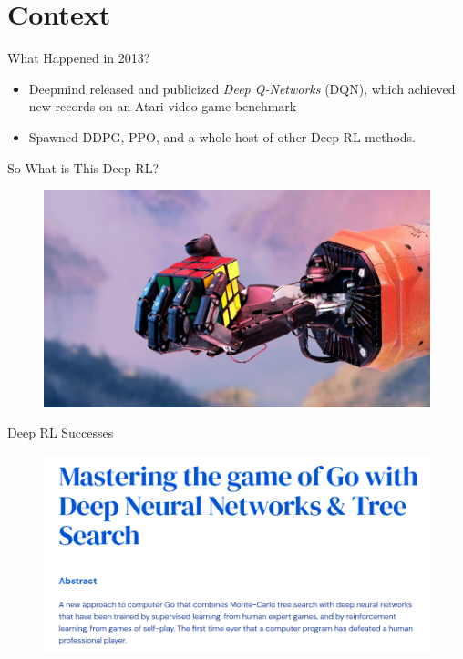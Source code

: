 \documentclass{beamer}
\begin{document}
\section{Context}

\begin{frame}{What Happened in 2013?}
  \begin{itemize}
    \item Deepmind released and publicized \emph{Deep Q-Networks} (DQN), which achieved new records on an Atari video game benchmark
    \item Spawned DDPG, PPO, and a whole host of other Deep RL methods.
  \end{itemize}
\end{frame}

\begin{frame}{So What is This Deep RL?}
  \begin{figure}
    \includegraphics[keepaspectratio,width=\textwidth]{assets/openai_rubiks}

    \caption{}
  \end{figure}
\end{frame}

\begin{frame}{Deep RL Successes}
  \begin{figure}
    \includegraphics[keepaspectratio,width=\textwidth]{assets/alphago}
  \end{figure}
\end{frame}
\end{document}
